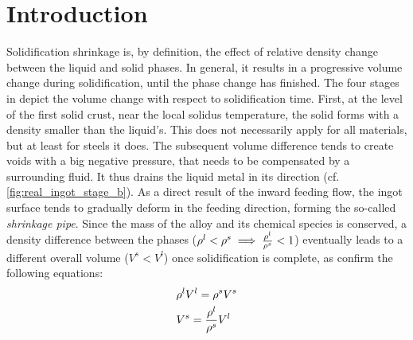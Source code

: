 \section{Introduction}
Solidification shrinkage is, by definition, the effect of relative density change between the liquid and solid phases.
In general, it results in a progressive volume change during solidification, until the phase change has finished. 
The four stages in  depict the volume change with 
respect to solidification time.
First, at the level of the first solid crust, near the local solidus temperature, the solid forms with a density smaller than 
the liquid's. This does not necessarily apply for all materials, but at least for steels it does. The subsequent volume difference 
tends to create voids with a big negative pressure, that needs to be compensated by a surrounding fluid. It thus drains 
the liquid metal in its direction (cf. \autoref{fig:real_ingot_stage_b}). As a direct result of the inward feeding flow, the ingot surface
tends to gradually deform in the feeding direction, forming the so-called \emph{shrinkage pipe}. Since the mass of the alloy and its 
chemical species is conserved, a density difference between the phases ($\rho^l < \rho^s \implies \frac{\rho^l}{\rho^s}<1$) eventually leads 
to a different overall volume ($V^s<V^l$) once solidification is complete, as confirm the following equations:
\begin{subequations}
\begin{align}
& \rho^l V^l = \rho^s V^s  \\ 
& V^s = \frac{\rho^l}{\rho^s} V^l
\end{align}
\end{subequations}
